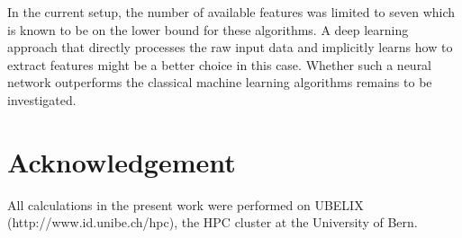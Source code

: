 \documentclass[journal]{IEEEtran}
\begin{document}
In the current setup, the number of available features was limited to seven which is known to be on the lower bound for these algorithms. A deep learning approach that directly processes the raw input data and implicitly learns how to extract features might be a better choice in this case. Whether such a neural network outperforms the classical machine learning algorithms remains to be investigated.

\section*{Acknowledgement}
All calculations in the present work were performed on UBELIX (http://www.id.unibe.ch/hpc), the HPC cluster at the University of Bern.



\end{document}
